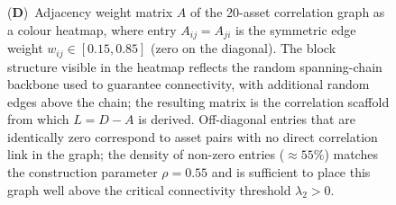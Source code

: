 \begin{figure}[!htbp]
{    (\textbf{D})~Adjacency weight matrix $A$ of the 20-asset correlation graph as a colour heatmap, where entry $A_{ij} = A_{ji}$ is the symmetric edge weight $w_{ij} \in [0.15, 0.85]$ (zero on the diagonal).  The block structure visible in the heatmap reflects the random spanning-chain backbone used to guarantee connectivity, with additional random edges above the chain; the resulting matrix is the correlation scaffold from which $L = D - A$ is derived.  Off-diagonal entries that are identically zero correspond to asset pairs with no direct correlation link in the graph; the density of non-zero entries ($\approx 55\%$) matches the construction parameter $\rho = 0.55$ and is sufficient to place this graph well above the critical connectivity threshold $\lambda_2 > 0$.}
    \label{fig:etf_panel_1}
\end{figure}

